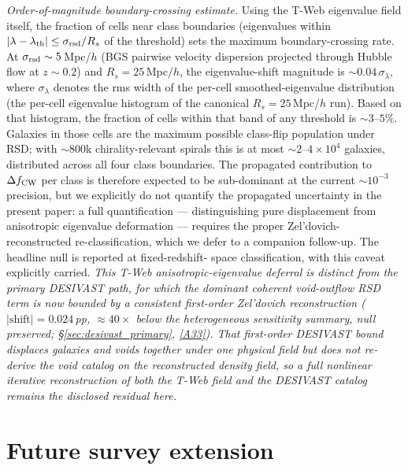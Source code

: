 \documentclass[aps,prd,twocolumn,superscriptaddress,showpacs,preprintnumbers,nofootinbib,longbibliography,floatfix]{revtex4-2}
\newcommand{\repoBase}{https://github.com/Hubify-Projects/bigbounce/blob/main}
\begin{document}
\begin{itemize}
\emph{Order-of-magnitude boundary-crossing estimate.}
Using the T-Web eigenvalue field itself, the fraction of cells near
class boundaries (eigenvalues within $|\lambda - \lambda_{\rm th}|
\le \sigma_{\rm rsd}/R_s$ of the threshold) sets the maximum
boundary-crossing rate. At $\sigma_{\rm rsd} \sim 5$\,Mpc/$h$ (BGS
pairwise velocity dispersion projected through Hubble flow at
$z\!\sim\!0.2$) and $R_s\!=\!25$\,Mpc/$h$, the eigenvalue-shift
magnitude is $\sim 0.04\,\sigma_\lambda$, where $\sigma_\lambda$
denotes the rms width of the per-cell smoothed-eigenvalue
distribution (the per-cell eigenvalue histogram of the canonical
$R_s\!=\!25$\,Mpc/$h$ run). Based on that histogram,
the fraction of cells within that band of any threshold is
$\sim 3$--$5\%$. Galaxies in those cells are the maximum possible
class-flip population under RSD; with $\sim 800$k chirality-relevant
spirals this is at most $\sim 2$--$4\times 10^4$ galaxies, distributed
across all four class boundaries. The propagated contribution to
$\Delta f_{\rm CW}$ per class is therefore expected to be
sub-dominant at the current $\sim 10^{-3}$ precision, but we
explicitly do not quantify the propagated uncertainty in the
present paper:
a full quantification — distinguishing pure displacement from
anisotropic eigenvalue deformation — requires the proper
Zel'dovich-reconstructed re-classification, which we defer to a
companion follow-up. The headline null is reported at fixed-redshift-
space classification, with this caveat explicitly carried.
\emph{This T-Web anisotropic-eigenvalue deferral is distinct from the
\emph{primary} DESIVAST path, for which the dominant coherent
void-outflow RSD term is now bounded by a consistent first-order
Zel'dovich reconstruction ($|\text{shift}| = 0.024$\,pp, ${\approx}40\times$
below the heterogeneous sensitivity summary, null preserved;
\S\ref{sec:desivast_primary},
\href{\repoBase/pipelines/p5\_desi\_chirality/outputs/27\_rsd\_void\_recon\_bound.json}{[A33]}).
That first-order DESIVAST bound displaces galaxies and voids together
under one physical field but does not re-derive the void catalog on the
reconstructed density field, so a full nonlinear iterative
reconstruction of both the T-Web field and the DESIVAST catalog remains
the disclosed residual here.}
\fi
\end{itemize}

\section{Future survey extension}\label{sec:lsst}
\end{document}
